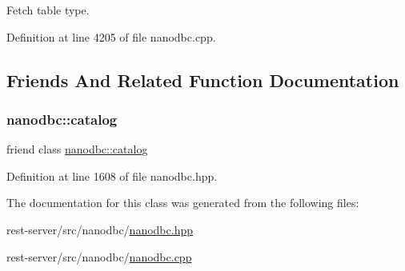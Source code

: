 Fetch table type. 



Definition at line 4205 of file nanodbc.\+cpp.



\subsection{Friends And Related Function Documentation}
\mbox{\label{classnanodbc_1_1catalog_1_1tables_af0f3134c7f6f1f36bfe1e247318dfe43}} 
\subsubsection{\texorpdfstring{nanodbc::catalog}{nanodbc::catalog}}
{\footnotesize\ttfamily friend class \mbox{\hyperlink{classnanodbc_1_1catalog}{nanodbc\+::catalog}}\hspace{0.3cm}{\ttfamily [friend]}}



Definition at line 1608 of file nanodbc.\+hpp.



The documentation for this class was generated from the following files\+:\begin{DoxyCompactItemize}
\item 
rest-\/server/src/nanodbc/\mbox{\hyperlink{nanodbc_8hpp}{nanodbc.\+hpp}}\item 
rest-\/server/src/nanodbc/\mbox{\hyperlink{nanodbc_8cpp}{nanodbc.\+cpp}}\end{DoxyCompactItemize}

